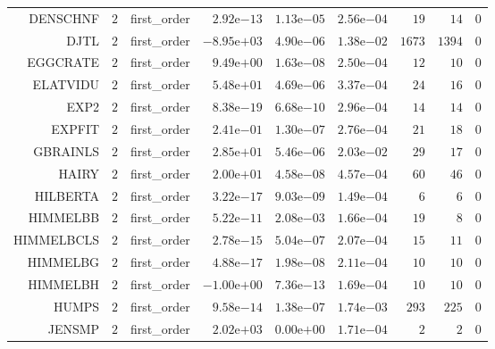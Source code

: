\begin{longtable}{rrrrrrrrr}
DENSCHNF & \(     2\) & first\_order & \( 2.92\)e\(-13\) & \( 1.13\)e\(-05\) & \( 2.56\)e\(-04\) & \(    19\) & \(    14\) & \(     0\) \\
DJTL & \(     2\) & first\_order & \(-8.95\)e\(+03\) & \( 4.90\)e\(-06\) & \( 1.38\)e\(-02\) & \(  1673\) & \(  1394\) & \(     0\) \\
EGGCRATE & \(     2\) & first\_order & \( 9.49\)e\(+00\) & \( 1.63\)e\(-08\) & \( 2.50\)e\(-04\) & \(    12\) & \(    10\) & \(     0\) \\
ELATVIDU & \(     2\) & first\_order & \( 5.48\)e\(+01\) & \( 4.69\)e\(-06\) & \( 3.37\)e\(-04\) & \(    24\) & \(    16\) & \(     0\) \\
EXP2 & \(     2\) & first\_order & \( 8.38\)e\(-19\) & \( 6.68\)e\(-10\) & \( 2.96\)e\(-04\) & \(    14\) & \(    14\) & \(     0\) \\
EXPFIT & \(     2\) & first\_order & \( 2.41\)e\(-01\) & \( 1.30\)e\(-07\) & \( 2.76\)e\(-04\) & \(    21\) & \(    18\) & \(     0\) \\
GBRAINLS & \(     2\) & first\_order & \( 2.85\)e\(+01\) & \( 5.46\)e\(-06\) & \( 2.03\)e\(-02\) & \(    29\) & \(    17\) & \(     0\) \\
HAIRY & \(     2\) & first\_order & \( 2.00\)e\(+01\) & \( 4.58\)e\(-08\) & \( 4.57\)e\(-04\) & \(    60\) & \(    46\) & \(     0\) \\
HILBERTA & \(     2\) & first\_order & \( 3.22\)e\(-17\) & \( 9.03\)e\(-09\) & \( 1.49\)e\(-04\) & \(     6\) & \(     6\) & \(     0\) \\
HIMMELBB & \(     2\) & first\_order & \( 5.22\)e\(-11\) & \( 2.08\)e\(-03\) & \( 1.66\)e\(-04\) & \(    19\) & \(     8\) & \(     0\) \\
HIMMELBCLS & \(     2\) & first\_order & \( 2.78\)e\(-15\) & \( 5.04\)e\(-07\) & \( 2.07\)e\(-04\) & \(    15\) & \(    11\) & \(     0\) \\
HIMMELBG & \(     2\) & first\_order & \( 4.88\)e\(-17\) & \( 1.98\)e\(-08\) & \( 2.11\)e\(-04\) & \(    10\) & \(    10\) & \(     0\) \\
HIMMELBH & \(     2\) & first\_order & \(-1.00\)e\(+00\) & \( 7.36\)e\(-13\) & \( 1.69\)e\(-04\) & \(    10\) & \(    10\) & \(     0\) \\
HUMPS & \(     2\) & first\_order & \( 9.58\)e\(-14\) & \( 1.38\)e\(-07\) & \( 1.74\)e\(-03\) & \(   293\) & \(   225\) & \(     0\) \\
JENSMP & \(     2\) & first\_order & \( 2.02\)e\(+03\) & \( 0.00\)e\(+00\) & \( 1.71\)e\(-04\) & \(     2\) & \(     2\) & \(     0\) \\

\end{longtable}
